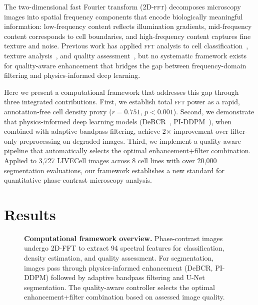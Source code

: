 \documentclass[11pt,a4paper]{article}
\newcommand{\fft}{\textsc{fft}\xspace}
\begin{document}
The two-dimensional fast Fourier transform (2D-\fft) decomposes microscopy images into spatial frequency components that encode biologically meaningful information: low-frequency content reflects illumination gradients, mid-frequency content corresponds to cell boundaries, and high-frequency content captures fine texture and noise. Previous work has applied \fft analysis to cell classification~\cite{lloyd1993}, texture analysis~\cite{castleman1979}, and quality assessment~\cite{bray2012}, but no systematic framework exists for quality-aware enhancement that bridges the gap between frequency-domain filtering and physics-informed deep learning.

Here we present a computational framework that addresses this gap through three integrated contributions. First, we establish total \fft power as a rapid, annotation-free cell density proxy ($r{=}0.751$, $p{<}0.001$). Second, we demonstrate that physics-informed deep learning models (DeBCR~\cite{li2024debcr}, PI-DDPM~\cite{wang2024piddpm}), when combined with adaptive bandpass filtering, achieve 2$\times$ improvement over filter-only preprocessing on degraded images. Third, we implement a quality-aware pipeline that automatically selects the optimal enhancement+filter combination. Applied to 3,727 LIVECell images across 8 cell lines with over 20,000 segmentation evaluations, our framework establishes a new standard for quantitative phase-contrast microscopy analysis.

\section{Results}
\label{sec:results}

\begin{figure}[H]
\centering

\caption{\textbf{Computational framework overview.} Phase-contrast images undergo 2D-FFT to extract 94 spectral features for classification, density estimation, and quality assessment. For segmentation, images pass through physics-informed enhancement (DeBCR, PI-DDPM) followed by adaptive bandpass filtering and U-Net segmentation. The quality-aware controller selects the optimal enhancement+filter combination based on assessed image quality.}
\label{fig:pipeline}
\end{figure}
\end{document}
